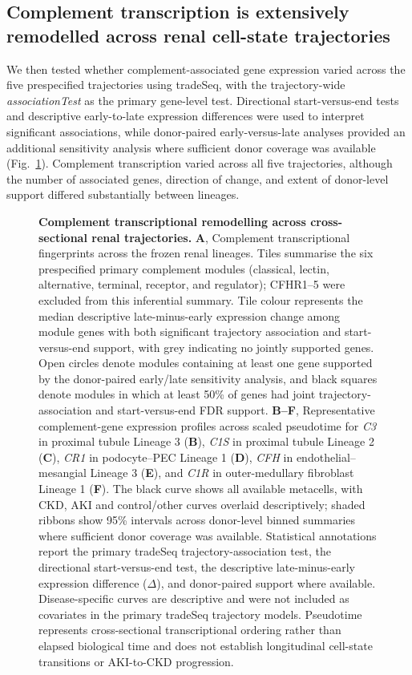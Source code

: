 \documentclass[10pt,letterpaper]{article}
\begin{document}
\subsection*{Complement transcription is extensively remodelled across renal cell-state trajectories}

We then tested whether complement-associated gene expression varied across the five prespecified trajectories using tradeSeq, with the trajectory-wide \textit{associationTest} as the primary gene-level test. Directional start-versus-end tests and descriptive early-to-late expression differences were used to interpret significant associations, while donor-paired early-versus-late analyses provided an additional sensitivity analysis where sufficient donor coverage was available (Fig.~\ref{fig:trajectory_complement}). Complement transcription varied across all five trajectories, although the number of associated genes, direction of change, and extent of donor-level support differed substantially between lineages.

\begin{figure}[!h]
\caption{\textbf{Complement transcriptional remodelling across cross-sectional renal trajectories.}
\textbf{A}, Complement transcriptional fingerprints across the frozen renal lineages. Tiles summarise the six prespecified primary complement modules (classical, lectin, alternative, terminal, receptor, and regulator); CFHR1--5 were excluded from this inferential summary. Tile colour represents the median descriptive late-minus-early expression change among module genes with both significant trajectory association and start-versus-end support, with grey indicating no jointly supported genes. Open circles denote modules containing at least one gene supported by the donor-paired early/late sensitivity analysis, and black squares denote modules in which at least 50\% of genes had joint trajectory-association and start-versus-end FDR support. \textbf{B--F}, Representative complement-gene expression profiles across scaled pseudotime for \textit{C3} in proximal tubule Lineage 3 (\textbf{B}), \textit{C1S} in proximal tubule Lineage 2 (\textbf{C}), \textit{CR1} in podocyte--PEC Lineage 1 (\textbf{D}), \textit{CFH} in endothelial--mesangial Lineage 3 (\textbf{E}), and \textit{C1R} in outer-medullary fibroblast Lineage 1 (\textbf{F}). The black curve shows all available metacells, with CKD, AKI and control/other curves overlaid descriptively; shaded ribbons show 95\% intervals across donor-level binned summaries where sufficient donor coverage was available. Statistical annotations report the primary tradeSeq trajectory-association test, the directional start-versus-end test, the descriptive late-minus-early expression difference ($\Delta$), and donor-paired support where available. Disease-specific curves are descriptive and were not included as covariates in the primary tradeSeq trajectory models. Pseudotime represents cross-sectional transcriptional ordering rather than elapsed biological time and does not establish longitudinal cell-state transitions or AKI-to-CKD progression.}
\label{fig:trajectory_complement}
\end{figure}
\end{document}
